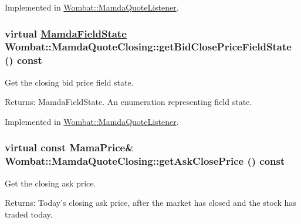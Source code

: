 Implemented in \hyperlink{classWombat_1_1MamdaQuoteListener_0c5bde1b3a4bfafdaef20c99c0c63c07}{Wombat::Mamda\-Quote\-Listener}.\hypertarget{classWombat_1_1MamdaQuoteClosing_b9a5522238b0f2c1d64a7192b28d4644}{
\subsubsection[getBidClosePriceFieldState]{\setlength{\rightskip}{0pt plus 5cm}virtual \hyperlink{namespaceWombat_93aac974f2ab713554fd12a1fa3b7d2a}{Mamda\-Field\-State} Wombat::Mamda\-Quote\-Closing::get\-Bid\-Close\-Price\-Field\-State () const}}
\label{classWombat_1_1MamdaQuoteClosing_b9a5522238b0f2c1d64a7192b28d4644}


Get the closing bid price field state. 

\begin{Desc}
\item[Returns:]Mamda\-Field\-State. An enumeration representing field state. \end{Desc}


Implemented in \hyperlink{classWombat_1_1MamdaQuoteListener_168cfd897d5c3f532d49e36c0e380db3}{Wombat::Mamda\-Quote\-Listener}.\hypertarget{classWombat_1_1MamdaQuoteClosing_0db88ef67d6459e31b0568e9bbd44d59}{
\subsubsection[getAskClosePrice]{\setlength{\rightskip}{0pt plus 5cm}virtual const Mama\-Price\& Wombat::Mamda\-Quote\-Closing::get\-Ask\-Close\-Price () const}}
\label{classWombat_1_1MamdaQuoteClosing_0db88ef67d6459e31b0568e9bbd44d59}


Get the closing ask price. 

\begin{Desc}
\item[Returns:]Today's closing ask price, after the market has closed and the stock has traded today. \end{Desc}


